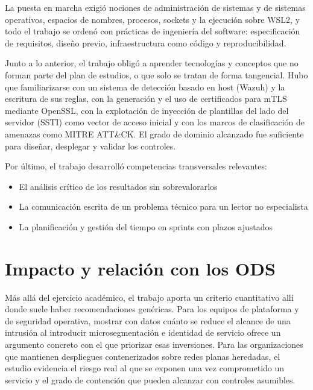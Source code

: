 \documentclass[11pt,spanish,listoffigures,listoftables]{tfgetsinf}
\begin{document}
        La puesta en marcha exigió nociones de administración de sistemas y de sistemas operativos, espacios de nombres, procesos, sockets y la ejecución sobre WSL2, y todo el trabajo se ordenó con prácticas de ingeniería del software: especificación de requisitos, diseño previo, infraestructura como código y reproducibilidad.
        
        Junto a lo anterior, el trabajo obligó a aprender tecnologías y conceptos que no forman parte del plan de estudios, o que solo se tratan de forma tangencial. Hubo que familiarizarse con un sistema de detección basado en host (Wazuh) y la escritura de sus reglas, con la generación y el uso de certificados para mTLS mediante OpenSSL, con la explotación de inyección de plantillas del lado del servidor (SSTI) como vector de acceso inicial y con los marcos de clasificación de amenazas como MITRE ATT\&CK. El grado de dominio alcanzado fue suficiente para diseñar, desplegar y validar los controles.
        
        Por último, el trabajo desarrolló competencias transversales relevantes: 
        \begin{itemize}
            \item El análisis crítico de los resultados sin sobrevalorarlos
            \item La comunicación escrita de un problema técnico para un lector no especialista
            \item La planificación y gestión del tiempo en sprints con plazos ajustados
        \end{itemize}

        \section{Impacto y relación con los ODS}
        
        Más allá del ejercicio académico, el trabajo aporta un criterio cuantitativo allí donde suele haber recomendaciones genéricas. Para los equipos de plataforma y de seguridad operativa, mostrar con datos cuánto se reduce el alcance de una intrusión al introducir microsegmentación e identidad de servicio ofrece un argumento concreto con el que priorizar esas inversiones. Para las organizaciones que mantienen despliegues contenerizados sobre redes planas heredadas, el estudio evidencia el riesgo real al que se exponen una vez comprometido un servicio y el grado de contención que pueden alcanzar con controles asumibles.
\end{document}

